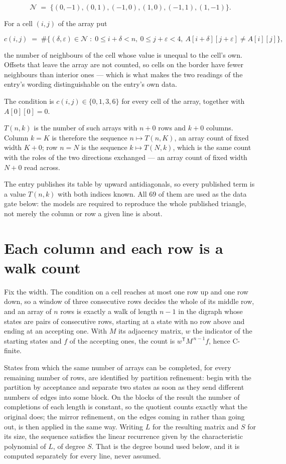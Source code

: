 \documentclass[11pt]{article}
\theoremstyle{definition}
\begin{document}
\[\mathcal{N} \;=\; \{(0,-1), (0,1), (-1,0), (1,0), (-1,1), (1,-1)\}.\]

For a cell $(i,j)$ of the array put

\[c(i,j) \;=\; \#\bigl\{(\delta,\varepsilon)\in\mathcal{N} \;:\; 0\le i+\delta<n,\ 0\le j+\varepsilon<4,\ A[i+\delta][j+\varepsilon] \neq A[i][j]\bigr\},\]

the number of neighbours of the cell whose value is unequal to the cell's own. Offsets that leave the array are not counted, so cells on the border have fewer neighbours than interior ones --- which is what makes the two readings of the entry's wording distinguishable on the entry's own data.

The condition is $c(i,j) \in \{0, 1, 3, 6\}$ for every cell of the array, together with $A[0][0]=0$.

$T(n,k)$ is the number of such arrays with $n + 0$ rows and $k + 0$ columns. Column $k = K$ is therefore the sequence $n \mapsto T(n,K)$, an array count of fixed width $K + 0$; row $n = N$ is the sequence $k \mapsto T(N,k)$, which is the same count with the roles of the two directions exchanged --- an array count of fixed width $N + 0$ read across.

The entry publishes its table by upward antidiagonals, so every published term is a value $T(n,k)$ with both indices known. All 69 of them are used as the data gate below: the models are required to reproduce the whole published triangle, not merely the column or row a given line is about.

\section{Each column and each row is a walk count}

Fix the width. The condition on a cell reaches at most one row up and one row down, so a window of three consecutive rows decides the whole of its middle row, and an array of $n$ rows is exactly a walk of length $n-1$ in the digraph whose states are pairs of consecutive rows, starting at a state with no row above and ending at an accepting one. With $M$ its adjacency matrix, $w$ the indicator of the starting states and $f$ of the accepting ones, the count is $w^{\mathsf T}M^{\,n-1}f$, hence C-finite.

States from which the same number of arrays can be completed, for every remaining number of rows, are identified by partition refinement: begin with the partition by acceptance and separate two states as soon as they send different numbers of edges into some block. On the blocks of the result the number of completions of each length is constant, so the quotient counts exactly what the original does; the mirror refinement, on the edges coming in rather than going out, is then applied in the same way. Writing $L$ for the resulting matrix and $S$ for its size, the sequence satisfies the linear recurrence given by the characteristic polynomial of $L$, of degree $S$. That is the degree bound used below, and it is computed separately for every line, never assumed.
\end{document}
